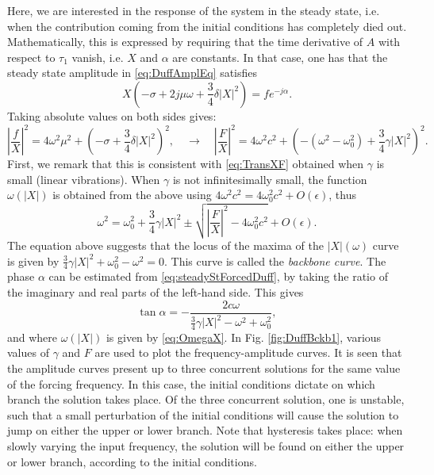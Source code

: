 \documentclass[11pt,twoside,a4paper,english]{book}
\begin{document}
Here, we are interested in the response of the system in the steady state, i.e. when the contribution coming from the initial conditions has completely died out. Mathematically, this is expressed by requiring that the time derivative of $A$ with respect to $\tau_1$ vanish, i.e. $X$ and $\alpha$ are constants. In that case, one has that the steady state amplitude in \eqref{eq:DuffAmplEq} satisfies
\begin{equation}\label{eq:steadyStForcedDuff}
X \left(-\sigma + 2j\mu\omega + \frac{3}{4}\delta |X|^2 \right) = f e^{-j\alpha}.
\end{equation}
Taking absolute values on both sides gives:
\begin{equation}
\left|\frac{f}{X}\right|^2 = 4\omega^2 \mu^2 + \left(-\sigma + \frac{3}{4}\delta|X|^2\right)^2, \quad \rightarrow \quad \left|\frac{F}{X}\right|^2 = 4\omega^2 c^2 + \left(-(\omega^2-\omega_0^2) + \frac{3}{4}\gamma|X|^2\right)^2.
\end{equation}
First, we remark that this is consistent with \eqref{eq:TransXF} obtained when $\gamma$ is small (linear vibrations). When $\gamma$ is not infinitesimally small, the function $\omega(|X|)$ is obtained from the above using $4\omega^2 c^2 = 4\omega_0^2 c^2 + O(\epsilon)$, thus
\begin{equation}\label{eq:OmegaX}
\omega^2 = \omega_0^2 + \frac{3}{4}\gamma |X|^2 \pm \sqrt{\left|\frac{F}{X}\right|^2 - 4\omega_0^2 c^2} + O(\epsilon).
\end{equation}
The equation above suggests that the locus of the maxima of the $|X|(\omega)$ curve is given by $\frac{3}{4}\gamma|X|^2+\omega_0^2-\omega^2 = 0$. This curve is called the \emph{backbone curve}. The phase $\alpha$ can be estimated from \eqref{eq:steadyStForcedDuff}, by taking the ratio of the imaginary and real parts of the left-hand side. This gives
\begin{equation}
\tan \alpha = -\frac{2c\omega}{\frac{3}{4}\gamma|X|^2-\omega^2+\omega_0^2},
\end{equation}
and where $\omega(|X|)$ is given by \eqref{eq:OmegaX}. In Fig. \ref{fig:DuffBckb1}, various values of $\gamma$ and $F$ are used to plot the frequency-amplitude curves. It is seen that the amplitude curves present up to three concurrent solutions for the same value of the forcing frequency. In this case, the initial conditions dictate on which branch the solution takes place. Of the three concurrent solution, one is unstable, such that a small perturbation of the initial conditions will cause the solution to jump on either the upper or lower branch. Note that hysteresis takes place: when slowly varying the input frequency, the solution will be found on either the upper or lower branch, according to the initial conditions. 
\end{document}
